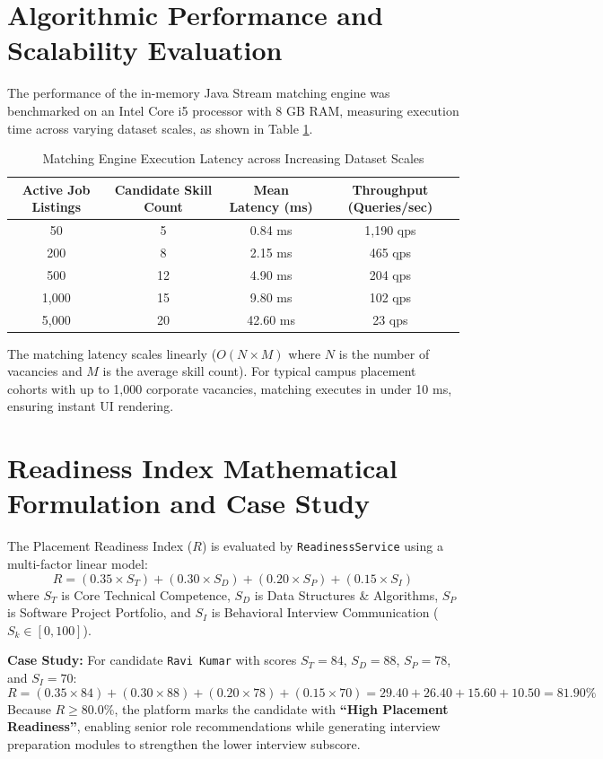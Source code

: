 \documentclass[11pt,a4paper]{report}
\begin{document}
\section{Algorithmic Performance and Scalability Evaluation}
The performance of the in-memory Java Stream matching engine was benchmarked on an Intel Core i5 processor with 8 GB RAM, measuring execution time across varying dataset scales, as shown in Table \ref{tab:benchmarks}.

\begin{table}[H]
    \centering
    \caption{Matching Engine Execution Latency across Increasing Dataset Scales}
    \label{tab:benchmarks}
    \small
    \begin{tabular}{cccc}
        \toprule
        \textbf{Active Job Listings} & \textbf{Candidate Skill Count} & \textbf{Mean Latency (ms)} & \textbf{Throughput (Queries/sec)} \\
        \midrule
        50 & 5 & 0.84 ms & 1,190 qps \\
        200 & 8 & 2.15 ms & 465 qps \\
        500 & 12 & 4.90 ms & 204 qps \\
        1,000 & 15 & 9.80 ms & 102 qps \\
        5,000 & 20 & 42.60 ms & 23 qps \\
        \bottomrule
    \end{tabular}
\end{table}

The matching latency scales linearly ($O(N \times M)$ where $N$ is the number of vacancies and $M$ is the average skill count). For typical campus placement cohorts with up to 1,000 corporate vacancies, matching executes in under 10 ms, ensuring instant UI rendering.

\section{Readiness Index Mathematical Formulation and Case Study}
The Placement Readiness Index ($R$) is evaluated by \texttt{ReadinessService} using a multi-factor linear model:
\begin{equation}
    R = (0.35 \times S_T) + (0.30 \times S_D) + (0.20 \times S_P) + (0.15 \times S_I)
\end{equation}
where $S_T$ is Core Technical Competence, $S_D$ is Data Structures \& Algorithms, $S_P$ is Software Project Portfolio, and $S_I$ is Behavioral Interview Communication ($S_k \in [0, 100]$).

\textbf{Case Study:} For candidate \texttt{Ravi Kumar} with scores $S_T=84$, $S_D=88$, $S_P=78$, and $S_I=70$:
\begin{equation}
    R = (0.35 \times 84) + (0.30 \times 88) + (0.20 \times 78) + (0.15 \times 70) = 29.40 + 26.40 + 15.60 + 10.50 = 81.90\%
\end{equation}
Because $R \ge 80.0\%$, the platform marks the candidate with \textbf{``High Placement Readiness''}, enabling senior role recommendations while generating interview preparation modules to strengthen the lower interview subscore.
\end{document}
